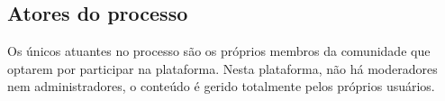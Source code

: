 \subsection{Atores do processo}
Os únicos atuantes no processo são os próprios membros da comunidade que optarem por participar na plataforma. Nesta plataforma, não há moderadores nem administradores, o conteúdo é gerido totalmente pelos próprios usuários.




